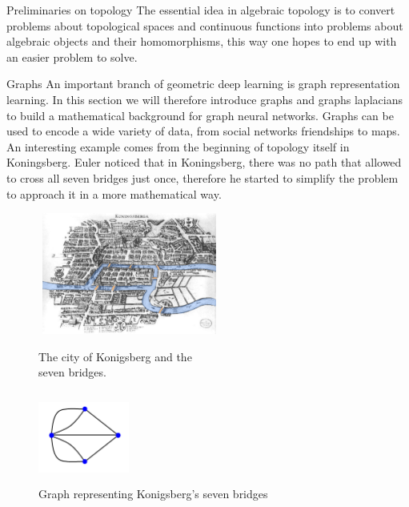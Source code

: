 \documentclass[12pt,a4paper]{report}
\theoremstyle{plain}
\theoremstyle{definition}
\theoremstyle{remark}
\begin{document}
    \begin{titlepage}
        
    \end{titlepage}
    \tableofcontents
    \newpage
    \begin{chapter}{Preliminaries on topology}
        \label{ch:1}
        The essential idea in algebraic topology is to convert problems about topological spaces and continuous functions into
        problems about algebraic objects and their homomorphisms, this way one hopes to end up with an easier problem to solve. 
        
    \end{chapter}
    \begin{chapter}{Graphs}
        An important branch of geometric deep learning is graph representation learning. In this section we will therefore
        introduce graphs and graphs laplacians to build a mathematical background for graph neural networks.
        Graphs can be used to encode a wide variety of data, from social networks friendships to maps. An interesting example
        comes from the beginning of topology itself in Koningsberg. Euler noticed that in Koningsberg, there was no path that 
        allowed to cross all seven bridges just once, therefore he started to simplify the problem to approach it in a more mathematical 
        way.
        \begin{figure}[H]
            \begin{minipage}{.5\textwidth}
                \centering
                \includegraphics[width=6cm, height=4cm]{sections/2/Bridge}
                \caption{The city of Konigsberg and the\\ seven bridges.}
                \label{fig:2:1}
            \end{minipage}
            \begin{minipage}{.5\textwidth}
                \centering
                \includegraphics[width=3cm, height=3cm]{sections/2/kgraph}
                \caption{Graph representing Konigsberg's seven bridges}
                \label{fig:2:2}
            \end{minipage}
        \end{figure}
        
    \end{chapter}
\end{document}
